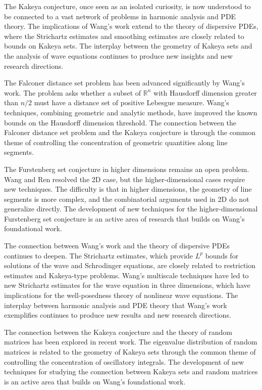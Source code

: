 The Kakeya conjecture, once seen as an isolated curiosity, is now understood to be connected to a vast network of problems in harmonic analysis and PDE theory. The implications of Wang's work extend to the theory of dispersive PDEs, where the Strichartz estimates and smoothing estimates are closely related to bounds on Kakeya sets. The interplay between the geometry of Kakeya sets and the analysis of wave equations continues to produce new insights and new research directions.

The Falconer distance set problem has been advanced significantly by Wang's work. The problem asks whether a subset of $\mathbb{R}^n$ with Hausdorff dimension greater than $n/2$ must have a distance set of positive Lebesgue measure. Wang's techniques, combining geometric and analytic methods, have improved the known bounds on the Hausdorff dimension threshold. The connection between the Falconer distance set problem and the Kakeya conjecture is through the common theme of controlling the concentration of geometric quantities along line segments.

The Furstenberg set conjecture in higher dimensions remains an open problem. Wang and Ren resolved the 2D case, but the higher-dimensional cases require new techniques. The difficulty is that in higher dimensions, the geometry of line segments is more complex, and the combinatorial arguments used in 2D do not generalize directly. The development of new techniques for the higher-dimensional Furstenberg set conjecture is an active area of research that builds on Wang's foundational work.

The connection between Wang's work and the theory of dispersive PDEs continues to deepen. The Strichartz estimates, which provide $L^p$ bounds for solutions of the wave and Schrodinger equations, are closely related to restriction estimates and Kakeya-type problems. Wang's multiscale techniques have led to new Strichartz estimates for the wave equation in three dimensions, which have implications for the well-posedness theory of nonlinear wave equations. The interplay between harmonic analysis and PDE theory that Wang's work exemplifies continues to produce new results and new research directions.

The connection between the Kakeya conjecture and the theory of random matrices has been explored in recent work. The eigenvalue distribution of random matrices is related to the geometry of Kakeya sets through the common theme of controlling the concentration of oscillatory integrals. The development of new techniques for studying the connection between Kakeya sets and random matrices is an active area that builds on Wang's foundational work.

